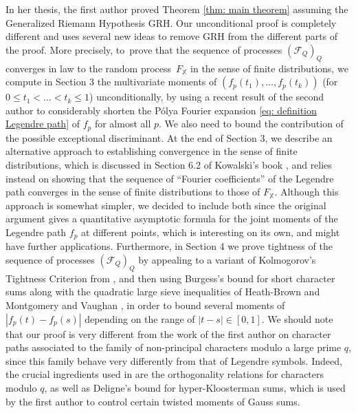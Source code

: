 \documentclass[JEP,XML,SOM,Unicode,NoFloatCountersInSection,published]{cedram}
\theoremstyle{plain}
\theoremstyle{definition}
\newcommand{\X}{\mathbb{X}}
\begin{document}
In her thesis, the first author proved Theorem \ref{thm: main theorem} assuming the Generalized Riemann Hypothesis GRH. Our unconditional proof is completely different and uses several new ideas to remove GRH
from the different parts of the proof. More precisely, to~prove that the sequence of processes $(\mathcal{F}_Q)_Q$ converges in law to the random process~$F_{\X}$ in the sense of finite distributions, we compute in Section 3 the multivariate moments of $(f_{p}(t_1), \dots, f_p(t_k))$ (for $0\le t_1<\dots <t_k\leq 1$) unconditionally, by using a recent result of the second author \cite{La} to considerably shorten the Pólya Fourier expansion \eqref{eq: definition Legendre path} of $f_p$ for almost all $p$. We also need to bound the contribution of the possible exceptional discriminant.
At the end of Section 3, we describe an alternative approach to establishing convergence in the sense of finite distributions, which is discussed in Section 6.2 of Kowalski's book \cite{Ko}, and relies instead on showing that the sequence of ``Fourier coefficients'' of the Legendre path converges in the sense of finite distributions to those of $F_{\X}$. Although this approach is somewhat simpler, we decided to include both since the original argument gives a quantitative asymptotic formula for the joint moments of the Legendre path $f_p$ at different points, which is interesting on its own, and might have further applications. Furthermore, in Section 4 we prove tightness of the sequence of processes $(\mathcal{F}_Q)_Q$ by appealing to a variant of Kolmogorov's Tightness Criterion from \cite{Ko}, and then using Burgess's bound for short character sums along with the quadratic large sieve inequalities of Heath-Brown \cite{HB} and Montgomery and Vaughan \cite{MoVaBook}, in order to bound several moments of $|f_p(t)-f_p(s)|$ depending on the range of $|t-s| \in [0,1]$. We should note that our proof is very different from the work of the first author \cite{Hu} on character paths associated to the family of non-principal characters modulo a large prime $q$, since this family behave very differently from that of Legendre symbols. Indeed, the crucial ingredients used in \cite{Hu} are the orthogonality relations for characters modulo $q$, as well as Deligne's bound for hyper-Kloosterman sums, which is used by the first author to control certain twisted moments of Gauss sums.
\end{document}
